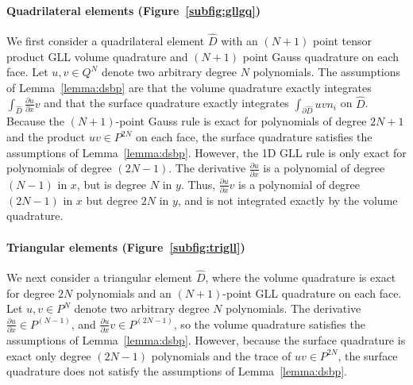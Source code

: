 \documentclass[review]{siamart0216}
\theoremstyle{assumption}
\renewcommand{\hat}[1]{\hat{#1}}
\newcommand{\pd}[2]{\frac{\partial#1}{\partial#2}}
\renewcommand{\hat}{\widehat}
\begin{document}
\paragraph{Quadrilateral elements (Figure~\ref{subfig:gllgq})} We first consider a quadrilateral element $\hat{D}$ with an $(N+1)$ point tensor product GLL volume quadrature and $(N+1)$ point Gauss quadrature on each face.  Let $u,v \in Q^N$ denote two arbitrary degree $N$ polynomials.  The assumptions of Lemma~\ref{lemma:dsbp} are that the volume quadrature exactly integrates $\int_{\hat{D}} \pd{u}{x} v$ and that the surface quadrature exactly integrates $\int_{\partial \hat{D}} u v n_i$ on $\hat{D}$.  Because the $(N+1)$-point Gauss rule is exact for polynomials of degree $2N+1$ and the product $uv \in P^{2N}$ on each face, the surface quadrature satisfies the assumptions of Lemma~\ref{lemma:dsbp}.  However, the 1D GLL rule is only exact for polynomials of degree $(2N-1)$.  The derivative $\pd{u}{x}$ is a polynomial of degree $(N-1)$ in $x$, but is degree $N$ in $y$.  Thus, $\pd{u}{x}v$ is a polynomial of degree $(2N-1)$ in $x$ but degree $2N$ in $y$, and is not integrated exactly by the volume quadrature.  

\paragraph{Triangular elements (Figure~\ref{subfig:trigll})} We next consider a triangular element $\hat{D}$, where the volume quadrature is exact for degree $2N$ polynomials \cite{xiao2010quadrature} and an $(N+1)$-point GLL quadrature on each face.  Let $u,v \in P^N$ denote two arbitrary degree $N$ polynomials.  The derivative $\pd{u}{x} \in P^{(N-1)}$, and $\pd{u}{x}v \in P^{(2N-1)}$, so the volume quadrature satisfies the assumptions of Lemma~\ref{lemma:dsbp}.  However, because the surface quadrature is exact only degree $(2N-1)$ polynomials and the trace of $uv\in P^{2N}$, the surface quadrature does not satisfy the assumptions of Lemma~\ref{lemma:dsbp}.
\end{document}
